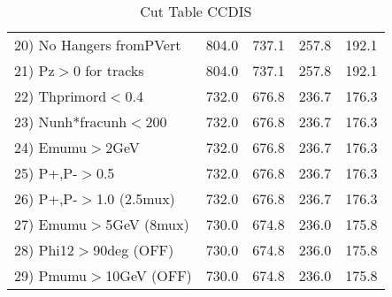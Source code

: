 \begin{table}[h!]
\begin{tabular}{||l||r|r|r|r||}
 20) No Hangers fromPVert &       804.0 &       737.1 &       257.8 &       192.1 \\
 21) Pz$>$0 for tracks    &       804.0 &       737.1 &       257.8 &       192.1 \\
 22) Thprimord$<$0.4      &       732.0 &       676.8 &       236.7 &       176.3 \\
 23) Nunh*fracunh$<$200   &       732.0 &       676.8 &       236.7 &       176.3 \\
 24) Emumu$>$2GeV         &       732.0 &       676.8 &       236.7 &       176.3 \\
 25) P+,P-$>$0.5          &       732.0 &       676.8 &       236.7 &       176.3 \\
 26) P+,P-$>$1.0 (2.5mux) &       732.0 &       676.8 &       236.7 &       176.3 \\
 27) Emumu$>$5GeV  (8mux) &       730.0 &       674.8 &       236.0 &       175.8 \\
 28) Phi12$>$90deg  (OFF) &       730.0 &       674.8 &       236.0 &       175.8 \\
 29) Pmumu$>$10GeV  (OFF) &       730.0 &       674.8 &       236.0 &       175.8 \\
 \hline
 \hline
 \end{tabular}
 \caption{Cut Table  CCDIS  }
 \label{tab-cut_ccdis}
 \end{table}
